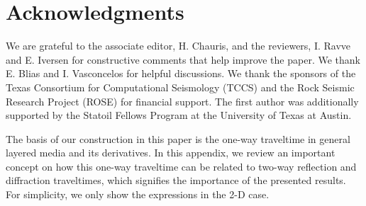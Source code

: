 \section{Acknowledgments}
We are grateful to the associate editor, H. Chauris, and the reviewers, I. Ravve and E. Iversen for constructive comments that help improve the paper. We thank E. Blias and I. Vasconcelos for helpful discussions. We thank the sponsors of the Texas Consortium for Computational Seismology (TCCS) and the Rock Seismic Research Project (ROSE) for financial support. The first author was additionally supported by the Statoil Fellows Program at the University of Texas at Austin.

\onecolumn



\clearpage
{}
The basis of our construction in this paper is the one-way traveltime in general layered media and its derivatives. In this appendix, we review an important concept on how this one-way traveltime can be related to two-way reflection and diffraction traveltimes, which signifies the importance of the presented results. For simplicity, we only show the expressions in the 2-D case.

